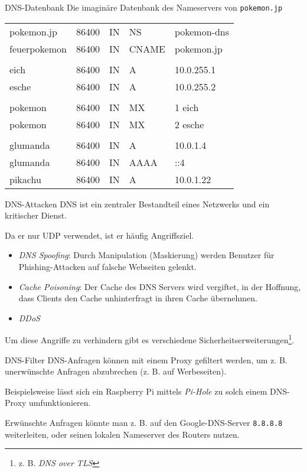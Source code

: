 \begin{example}{DNS-Datenbank}
    Die imaginäre Datenbank des Nameservers von \texttt{pokemon.jp}

    \begin{center}
        \begin{tabular}{TTTTT}
            pokemon.jp   & 86400 & IN & NS    & pokemon-dns \\
            feuerpokemon & 86400 & IN & CNAME & pokemon.jp  \\
            \\
            eich         & 86400 & IN & A     & 10.0.255.1  \\
            esche        & 86400 & IN & A     & 10.0.255.2  \\
            \\
            pokemon      & 86400 & IN & MX    & 1 eich      \\
            pokemon      & 86400 & IN & MX    & 2 esche     \\
            \\
            glumanda     & 86400 & IN & A     & 10.0.1.4    \\
            glumanda     & 86400 & IN & AAAA  & ::4         \\
            pikachu      & 86400 & IN & A     & 10.0.1.22   \\
        \end{tabular}
    \end{center}
\end{example}

\begin{bonus}{DNS-Attacken}
    DNS ist ein zentraler Bestandteil eines Netzwerks und ein kritischer Dienst.

    Da er nur UDP verwendet, ist er häufig Angriffsziel.

    \begin{itemize}
        \item \emph{DNS Spoofing}:
              Durch Manipulation (Maskierung) werden Benutzer für Phishing-Attacken auf falsche Webseiten gelenkt.
        \item \emph{Cache Poisoning}:
              Der Cache des DNS Servers wird vergiftet, in der Hoffnung, dass Clients den Cache unhinterfragt in ihren Cache übernehmen.
        \item \emph{DDoS}
    \end{itemize}

    Um diese Angriffe zu verhindern gibt es verschiedene Sicherheitserweiterungen\footnote{z. B. \emph{DNS over TLS}}.
\end{bonus}

\begin{bonus}{DNS-Filter}
    DNS-Anfragen können mit einem Proxy gefiltert werden, um z. B. unerwünschte Anfragen abzubrechen (z. B. auf Werbeseiten).

    Beispielsweise lässt sich ein Raspberry Pi mittels \emph{Pi-Hole} zu solch einem DNS-Proxy umfunktionieren.

    Erwünschte Anfragen könnte man z. B. auf den Google-DNS-Server \texttt{8.8.8.8} weiterleiten, oder seinen lokalen Nameserver des Routers nutzen.
\end{bonus}